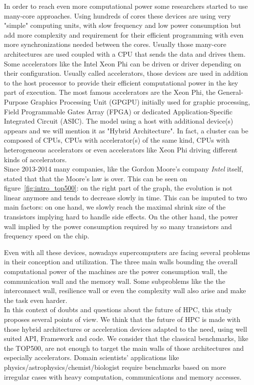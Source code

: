 In order to reach even more computational power some researchers started to use many-core approaches. 
Using hundreds of cores these devices are using very "simple" computing units, with slow frequency and low power consumption but add more complexity and requirement for their efficient programming with even more synchronizations needed between the cores. 
Usually those many-core architectures are used coupled with a CPU that sends the data and drives them.
Some accelerators like the Intel Xeon Phi can be driven or driver depending on their configuration. 
Usually called accelerators, those devices are used in addition to the host processor to provide their efficient computational power in the key part of execution. 
The most famous accelerators are the Xeon Phi, the General-Purpose Graphics Processing Unit (GPGPU) initially used for graphic processing, Field Programmable Gates Array (FPGA) or dedicated Application-Specific Integrated Circuit (ASIC).
The model using a host with additional device(s) appears and we will mention it as "Hybrid Architecture".
In fact, a cluster can be composed of CPUs, CPUs with accelerator(s) of the same kind, CPUs with heterogeneous accelerators or even accelerators like Xeon Phi driving different kinds of accelerators.\\

Since 2013-2014 many companies, like the Gordon Moore's company \textit{Intel} itself, stated that that the Moore's law is over. 
This can be seen on figure~\ref{fig:intro_top500}: on the right part of the graph, the evolution is not linear anymore and tends to decrease slowly in time. 
This can be imputed to two main factors: on one hand, we slowly reach the maximal shrink size of the transistors implying hard to handle side effects. 
On the other hand, the power wall implied by the power consumption required by so many transistors and frequency speed on the chip.

Even with all these devices, nowadays supercomputers are facing several problems in their conception and utilization. 
The three main walls bounding the overall computational power of the machines are the power consumption wall, the communication wall and the memory wall.  
Some subproblems like the the interconnect wall, resilience wall or even the complexity wall also arise and make the task even harder.\\

In this context of doubts and questions about the future of HPC, this study proposes several points of view. 
We think that the future of HPC is made with those hybrid architectures or acceleration devices adapted to the need, using well suited API, Framework and code.
We consider that the classical benchmarks, like the TOP500, are not enough to target the main walls of those architectures and especially accelerators. 
Domain scientists’ applications like physics/astrophysics/chemist/biologist require benchmarks based on more irregular cases with heavy computation, communications and memory accesses. 

